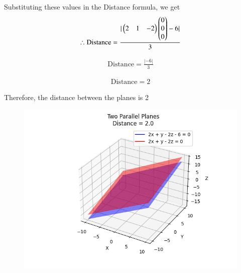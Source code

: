 \documentclass[journal]{IEEEtran}
\begin{document}
Substituting these values in the Distance formula, we get\\
\begin{align}
\therefore \text{Distance} = \frac{|\begin{pmatrix}2 & 1 & -2\end{pmatrix}\begin{pmatrix}0 \\ 0 \\ 0\end{pmatrix} - 6|}{3}
\end{align}

\begin{align}
\text{Distance} = \frac{|-6|}{3}
\end{align}

\begin{align}
\text{Distance} = 2
\end{align}

Therefore, the distance between the planes is 2
\begin{figure}[h!]
    \centering
    \includegraphics[height=0.5\textheight, keepaspectratio]{figs/Figure_1.png}
    \label{figure_1}
\end{figure}
\end{document}
